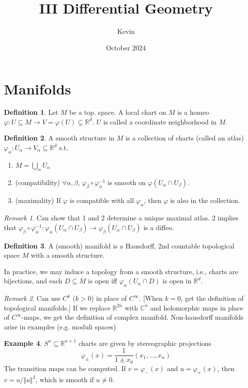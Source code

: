 \documentclass{article}
\title{III Differential Geometry}
\author{Kevin}
\date{October 2024}
\theoremstyle{definition}
\newtheorem{defn}{Definition}[section]
\newtheorem{example}[defn]{Example}
\theoremstyle{remark}
\newtheorem{rem}{Remark}
\theoremstyle{plain}
\newcommand{\RR}{\mathbb{R}}
\newcommand{\CC}{\mathbb{C}}
\begin{document}
\maketitle
\section{Manifolds}
\begin{defn}
    Let $M$ be a top. space. A local chart on $M$ is a homeo $\varphi:U\subseteq M\to V=\varphi(U)\subseteq \RR^d$. $U$ is called a coordinate neighborhood in $M$.
\end{defn}
\begin{defn}
    A smooth structure in $M$ is a collection of charts (called an atlas) $\varphi_\alpha:U_\alpha\to V_\alpha\subseteq\RR^d$ s.t.
    \begin{enumerate}
        \item $M=\bigcup_\alpha U_\alpha$
        \item (compatibility) $\forall\alpha,\beta$, $\varphi_\beta\circ\varphi_\alpha^{-1}$ is smooth on $\varphi(U_\alpha\cap U_\beta)$.
        \item (maximality) If $\varphi$ is compatible with all $\varphi_\alpha$, then $\varphi$ is also in the collection.
    \end{enumerate}
\end{defn}
\begin{rem}
    Can show that 1 and 2 determine a unique maximal atlas. 2 implies that $\varphi_\beta\circ\varphi_\alpha^{-1}:\varphi_\alpha(U_\alpha\cap U_\beta)\to \varphi_\beta(U_\alpha\cap U_\beta)$ is a diffeo.
\end{rem}
\begin{defn}
    A (smooth) manifold is a Hausdorff, 2nd countable topological space $M$ with a smooth structure.
\end{defn}
In practice, we may induce a topology from a smooth structure, i.e., charts are bijections, and each $D\subseteq M$ is open iff $\varphi_\alpha(U_\alpha\cap D)$ is open in $\RR^d$.
\begin{rem}
    Can use $C^k$ ($k>0$) in place of $C^\infty$. [When $k=0$, get the definition of topological manifolds.]
    If we replace $\RR^{2n}$ with $\CC^n$ and holomorphic maps in place of $C^\infty$-maps, we get the definition of complex manifold. Non-hausdorff manifolds arise in examples (e.g. moduli spaces)
\end{rem}
\begin{example}
    $S^n\subseteq\RR^{n+1}$ charts are given by stereographic projections
    \[\varphi_\pm(x)=\dfrac{1}{1\pm x_0}(x_1,...,x_n)\]
    The transition maps can be computed. If $v=\varphi_-(x)$ and $u=\varphi_+(x)$, then $v=u/\Vert u\Vert^2$, which is smooth if $u\neq 0$.
\end{example}
\end{document}
